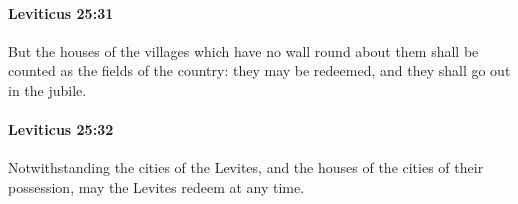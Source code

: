 		\paragraph{Leviticus 25:31} %
			\label{LEVITICUS-25-31}

			But the houses of the villages which have no wall round about them shall be counted as the fields of the country: they may be redeemed, and they shall go out in the jubile.


		\paragraph{Leviticus 25:32} %
			\label{LEVITICUS-25-32}

			Notwithstanding the cities of the Levites, and the houses of the cities of their possession, may the Levites redeem at any time.


